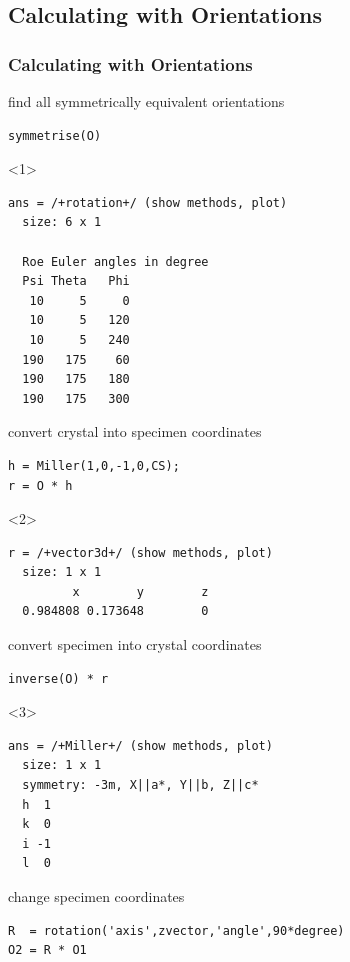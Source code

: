 \documentclass[compress]{beamer}
\begin{document}
\subsection*{Calculating with Orientations}
\label{sec:calc-with-orient}

\begin{frame}
  \frametitle{Calculating with Orientations}


  \begin{overlayarea}{\textwidth}{8cm}
  find all symmetrically equivalent orientations
\begin{lstlisting}[style=input]
symmetrise(O)
\end{lstlisting}
  \begin{onlyenv}<1>
    \vspace{-.3cm}
    \begin{lstlisting}[style=output]
ans = /+rotation+/ (show methods, plot)
  size: 6 x 1

  Roe Euler angles in degree
  Psi Theta   Phi
   10     5     0
   10     5   120
   10     5   240
  190   175    60
  190   175   180
  190   175   300
\end{lstlisting}
  \end{onlyenv}

  \pause
  \medskip

  convert crystal into specimen coordinates
\begin{lstlisting}[style=input]
h = Miller(1,0,-1,0,CS);
r = O * h
\end{lstlisting}
  \begin{onlyenv}<2>
\vspace{-.3cm}\begin{lstlisting}[style=output]
  r = /+vector3d+/ (show methods, plot)
  size: 1 x 1
         x        y        z
  0.984808 0.173648        0
\end{lstlisting}
  \end{onlyenv}

  \pause
  \medskip

  convert specimen into crystal coordinates
\begin{lstlisting}[style=input]
inverse(O) * r
\end{lstlisting}
  \begin{onlyenv}<3>
\vspace{-.3cm}\begin{lstlisting}[style=output]
ans = /+Miller+/ (show methods, plot)
  size: 1 x 1
  symmetry: -3m, X||a*, Y||b, Z||c*
  h  1
  k  0
  i -1
  l  0
\end{lstlisting}
  \end{onlyenv}

  \pause
  \medskip

  change specimen coordinates
  \begin{lstlisting}[style=input]
R  = rotation('axis',zvector,'angle',90*degree)
O2 = R * O1
\end{lstlisting}
\end{overlayarea}

\end{frame}
\end{document}
